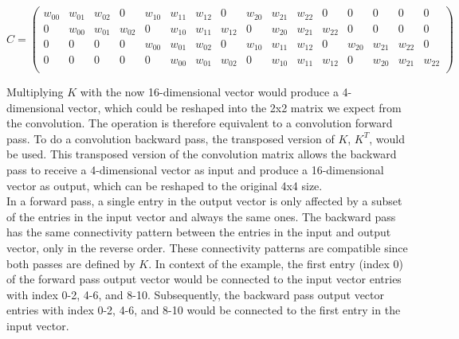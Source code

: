 \[
    C = 
    \left(
    \begin{smallmatrix}
    \textit{$w_{00}$} & \textit{$w_{01}$} & \textit{$w_{02}$} & 0 & 
    \textit{$w_{10}$} & \textit{$w_{11}$} & \textit{$w_{12}$} & 0 & 
    \textit{$w_{20}$} & \textit{$w_{21}$} & \textit{$w_{22}$} & 0 & 
    0 & 0 & 0 & 0\\
    0 & \textit{$w_{00}$} & \textit{$w_{01}$} & \textit{$w_{02}$} & 
    0 & \textit{$w_{10}$} & \textit{$w_{11}$} & \textit{$w_{12}$} & 
    0 & \textit{$w_{20}$} & \textit{$w_{21}$} & \textit{$w_{22}$} & 
    0 & 0 & 0 & 0\\
    0 & 0 & 0 & 0 & 
    \textit{$w_{00}$} & \textit{$w_{01}$} & \textit{$w_{02}$} & 0 & 
    \textit{$w_{10}$} & \textit{$w_{11}$} & \textit{$w_{12}$} & 0 & 
    \textit{$w_{20}$} & \textit{$w_{21}$} & \textit{$w_{22}$} & 0\\
    0 & 0 & 0 & 0 & 
    0 & \textit{$w_{00}$} & \textit{$w_{01}$} & \textit{$w_{02}$} & 
    0 & \textit{$w_{10}$} & \textit{$w_{11}$} & \textit{$w_{12}$} & 
    0 & \textit{$w_{20}$} & \textit{$w_{21}$} & \textit{$w_{22}$}\\
    \end{smallmatrix}
    \right)
\]

\noindent Multiplying $K$ with the now 16-dimensional vector would produce a 4-dimensional vector, which could be reshaped into the 2x2 matrix we expect from the convolution. The operation is therefore equivalent to a convolution forward pass. To do a convolution backward pass, the transposed version of $K$, $K^T$, would be used. This transposed version of the convolution matrix allows the backward pass to receive a 4-dimensional vector as input and produce a 16-dimensional vector as output, which can be reshaped to the original 4x4 size. \\

\noindent In a forward pass, a single entry in the output vector is only affected by a subset of the entries in the input vector and always the same ones. The backward pass has the same connectivity pattern between the entries in the input and output vector, only in the reverse order. These connectivity patterns are compatible since both passes are defined by $K$. In context of the example, the first entry (index 0) of the forward pass output vector would be connected to the input vector entries with index 0-2, 4-6, and 8-10. Subsequently, the backward pass output vector entries with index 0-2, 4-6, and 8-10 would be connected to the first entry in the input vector.\\

